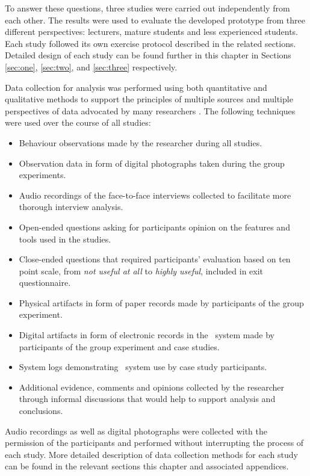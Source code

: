 To answer these questions, three studies were carried out independently from
each other. The results were used to evaluate the developed prototype from three
different perspectives: lecturers, mature students and less experienced
students. Each study followed its own exercise protocol described in the related
sections. Detailed design of each study can be found further in this chapter in
Sections \ref{sec:one}, \ref{sec:two}, and \ref{sec:three} respectively.

Data collection for analysis was performed using both quantitative and
qualitative methods to support the principles of multiple sources and multiple
perspectives of data advocated by many researchers
\citep{Yin2009,Maimbo2005,Marshall2010}. The following techniques were used over
the course of all studies:

\begin{itemize}
  \item Behaviour observations made by the researcher during all studies.
  \item Observation data in form of digital photographs taken during the group
  experiments.
  \item Audio recordings of the face-to-face interviews collected to facilitate
  more thorough interview analysis.
  \item Open-ended questions asking for participants opinion on the features and
  tools used in the studies.
  \item Close-ended questions that required participants' evaluation based on
  ten point scale, from \textit{not useful at all} to \textit{highly useful}, 
  included in exit questionnaire.
  \item Physical artifacts in form of paper records made by participants of the
  group experiment.
  \item Digital artifacts in form of electronic records in the \ep~system made
  by participants of the group experiment and case studies.
  \item System logs demonstrating \ep~system use by case study participants.
  \item Additional evidence, comments and opinions collected by the researcher
  through informal discussions that would help to support analysis and
  conclusions.
\end{itemize}

Audio recordings as well as digital photographs were collected with the
permission of the participants and performed without interrupting the process of
each study. More detailed description of data collection methods for each study
can be found in the relevant sections this chapter and associated appendices. 

